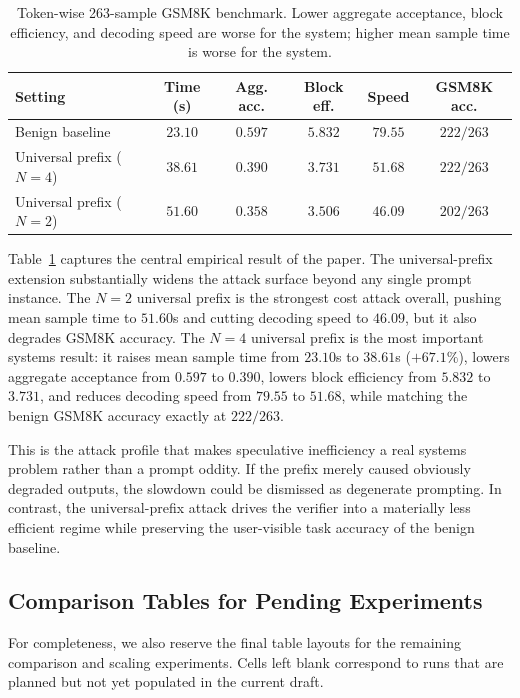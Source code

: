 \begin{table}[t]
\centering
\caption{Token-wise 263-sample GSM8K benchmark. Lower aggregate acceptance,
block efficiency, and decoding speed are worse for the system; higher mean
sample time is worse for the system.}
\label{tab:tokenwise-benchmark}
\footnotesize
\begin{tabular}{lccccc}
\toprule
Setting & Time (s) & Agg. acc. & Block eff. & Speed & GSM8K acc. \\
\midrule
Benign baseline & $23.10$ & $0.597$ & $5.832$ & $79.55$ & $222/263$ \\
Universal prefix ($N=4$) & $38.61$ & $0.390$ & $3.731$ & $51.68$ & $222/263$ \\
Universal prefix ($N=2$) & $51.60$ & $0.358$ & $3.506$ & $46.09$ & $202/263$ \\
\bottomrule
\end{tabular}
\end{table}

Table~\ref{tab:tokenwise-benchmark} captures the central empirical result of
the paper. The universal-prefix extension substantially widens the attack
surface beyond any single prompt instance. The $N=2$ universal prefix is the
strongest cost attack overall, pushing mean sample time to $51.60$s and
cutting decoding speed to $46.09$, but it also degrades GSM8K accuracy. The
$N=4$ universal prefix is the most important systems result: it raises mean
sample time from $23.10$s to $38.61$s ($+67.1\%$), lowers aggregate acceptance
from $0.597$ to $0.390$, lowers block efficiency from $5.832$ to $3.731$, and
reduces decoding speed from $79.55$ to $51.68$, while matching the benign
GSM8K accuracy exactly at $222/263$.

This is the attack profile that makes speculative inefficiency a real systems
problem rather than a prompt oddity. If the prefix merely caused obviously
degraded outputs, the slowdown could be dismissed as degenerate prompting. In
contrast, the universal-prefix attack drives the verifier into a materially
less efficient regime while preserving the user-visible task accuracy of the
benign baseline.

\subsection{Comparison Tables for Pending Experiments}

For completeness, we also reserve the final table layouts for the remaining
comparison and scaling experiments. Cells left blank correspond to runs that
are planned but not yet populated in the current draft.

